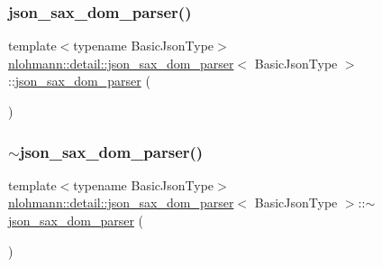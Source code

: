 \subsubsection{\texorpdfstring{json\+\_\+sax\+\_\+dom\+\_\+parser()}{json\_sax\_dom\_parser()}\hspace{0.1cm}{\footnotesize\ttfamily [3/3]}}
{\footnotesize\ttfamily template$<$typename Basic\+Json\+Type$>$ \\
\hyperlink{classnlohmann_1_1detail_1_1json__sax__dom__parser}{nlohmann\+::detail\+::json\+\_\+sax\+\_\+dom\+\_\+parser}$<$ Basic\+Json\+Type $>$\+::\hyperlink{classnlohmann_1_1detail_1_1json__sax__dom__parser}{json\+\_\+sax\+\_\+dom\+\_\+parser} (\begin{DoxyParamCaption}\item[{\hyperlink{classnlohmann_1_1detail_1_1json__sax__dom__parser}{json\+\_\+sax\+\_\+dom\+\_\+parser}$<$ Basic\+Json\+Type $>$ \&\&}]{ }\end{DoxyParamCaption})\hspace{0.3cm}{\ttfamily [default]}}

\mbox{\label{classnlohmann_1_1detail_1_1json__sax__dom__parser_a4b93deb5c1d716dcfb33b3ed8a00ac4d}} 
\subsubsection{\texorpdfstring{$\sim$json\+\_\+sax\+\_\+dom\+\_\+parser()}{~json\_sax\_dom\_parser()}}
{\footnotesize\ttfamily template$<$typename Basic\+Json\+Type$>$ \\
\hyperlink{classnlohmann_1_1detail_1_1json__sax__dom__parser}{nlohmann\+::detail\+::json\+\_\+sax\+\_\+dom\+\_\+parser}$<$ Basic\+Json\+Type $>$\+::$\sim$\hyperlink{classnlohmann_1_1detail_1_1json__sax__dom__parser}{json\+\_\+sax\+\_\+dom\+\_\+parser} (\begin{DoxyParamCaption}{ }\end{DoxyParamCaption})\hspace{0.3cm}{\ttfamily [default]}}



